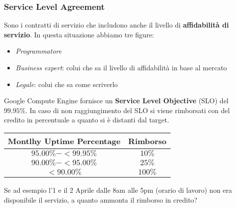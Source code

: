 \subsubsection{Service Level Agreement}
Sono i contratti di servizio che includono anche il livello di \textbf{affidabilità di servizio}. In questa situazione abbiamo tre figure:
\begin{itemize}
	\item \textit{Programmatore}
	\item \textit{Business expert}: colui che sa il livello di affidabilità in base al mercato
	\item \textit{Legale}: colui che sa come scriverlo
\end{itemize}
\begin{example}
	Google Compute Engine fornisce un \textbf{Service Level Objective} (SLO) del $99.95\%$. In caso di non raggiungimento del SLO si viene rimborsati con del credito in percentuale a quanto si è distanti dal target.\\
	\begin{center}
		\begin{tabular}{|c|c|}
			\hline
			\textbf{Montlhy Uptime Percentage} & \textbf{Rimborso} \\
			\hline
			$95.00\%-<99.95\%$ & $10\%$ \\
			\hline
			$90.00\%-<95.00\%$ & $25\%$ \\
			\hline
			$<90.00\%$ & $100\%$ \\
			\hline
		\end{tabular}
	\end{center}
	Se ad esempio l'1 e il 2 Aprile dalle 8am alle 5pm (orario di lavoro) non era disponibile il servizio, a quanto ammonta il rimborso in credito?
\end{example}